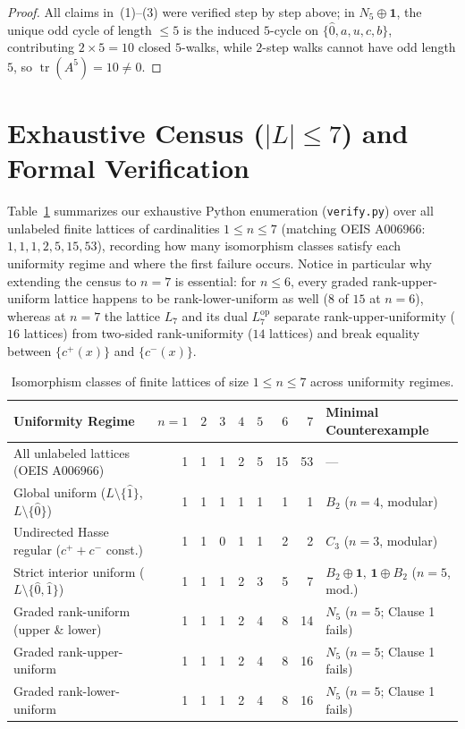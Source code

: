 \documentclass[11pt,a4paper]{article}
\theoremstyle{definition}
\theoremstyle{remark}
\newcommand{\tr}{\operatorname{tr}}
\newcommand{\op}{\mathrm{op}}
\begin{document}
\begin{proof}
All claims in~(1)--(3) were verified step by step above; in $N_5 \oplus \mathbf{1}$, the unique odd cycle of length $\le 5$ is the induced $5$-cycle on $\{\hat{0}, a, u, c, b\}$, contributing $2 \times 5 = 10$ closed $5$-walks, while $2$-step walks cannot have odd length $5$, so $\tr(A^5) = 10 \neq 0$.
\end{proof}

\section{Exhaustive Census (\texorpdfstring{$|L| \le 7$}{|L| <= 7}) and Formal Verification}

Table~\ref{tab:census} summarizes our exhaustive Python enumeration (\texttt{verify.py}) over all unlabeled finite lattices of cardinalities $1 \le n \le 7$ (matching OEIS A006966: $1, 1, 1, 2, 5, 15, 53$), recording how many isomorphism classes satisfy each uniformity regime and where the first failure occurs. Notice in particular why extending the census to $n=7$ is essential: for $n \le 6$, every graded rank-upper-uniform lattice happens to be rank-lower-uniform as well ($8$ of $15$ at $n=6$), whereas at $n=7$ the lattice $L_7$ and its dual $L_7^\op$ separate rank-upper-uniformity ($16$ lattices) from two-sided rank-uniformity ($14$ lattices) and break equality between $\{c^+(x)\}$ and $\{c^-(x)\}$.

\begin{table}[htbp]
\centering
\caption{Isomorphism classes of finite lattices of size $1 \le n \le 7$ across uniformity regimes.}
\label{tab:census}
\vspace{2pt}
{\footnotesize
\setlength{\tabcolsep}{4.2pt}
\begin{tabular}{@{}lrrrrrrrl@{}}
\toprule
Uniformity Regime & $n{=}1$ & $2$ & $3$ & $4$ & $5$ & $6$ & $7$ & Minimal Counterexample \\
\midrule
All unlabeled lattices (OEIS A006966) & 1 & 1 & 1 & 2 & 5 & 15 & 53 & --- \\
Global uniform ($L\setminus\{\hat{1}\}$, $L\setminus\{\hat{0}\}$) & 1 & 1 & 1 & 1 & 1 & 1 & 1 & $B_2$ ($n=4$, modular) \\
Undirected Hasse regular ($c^+{+}c^-$ const.) & 1 & 1 & 0 & 1 & 1 & 2 & 2 & $C_3$ ($n=3$, modular) \\
Strict interior uniform ($L\setminus\{\hat{0},\hat{1}\}$) & 1 & 1 & 1 & 2 & 3 & 5 & 7 & $B_2\oplus\mathbf{1},\,\mathbf{1}\oplus B_2$ ($n=5$, mod.) \\
Graded rank-uniform (upper \& lower) & 1 & 1 & 1 & 2 & 4 & 8 & 14 & $N_5$ ($n=5$; Clause 1 fails) \\
Graded rank-upper-uniform & 1 & 1 & 1 & 2 & 4 & 8 & 16 & $N_5$ ($n=5$; Clause 1 fails) \\
Graded rank-lower-uniform & 1 & 1 & 1 & 2 & 4 & 8 & 16 & $N_5$ ($n=5$; Clause 1 fails) \\
\bottomrule
\end{tabular}}
\end{table}
\end{document}
